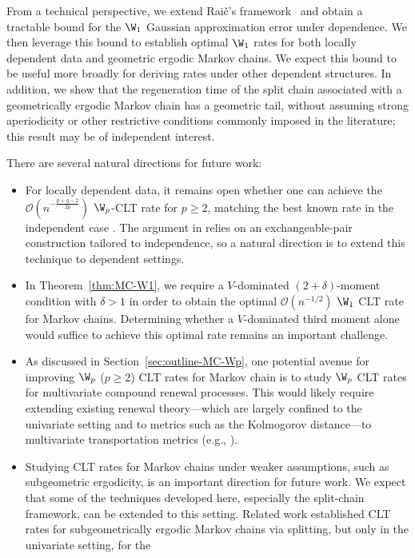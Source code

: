 \documentclass[mnsc,nonblindrev]{informs3}
\begin{document}
From a technical perspective, we extend Rai\v{c}'s framework~\citep{raivc2018multivariate} and obtain a tractable bound for the
$\W_1$ Gaussian approximation error under dependence. We then leverage this bound to establish optimal $\W_1$ rates for both locally dependent data
and geometric ergodic Markov chains. We expect this bound to be useful more broadly for
deriving rates under other dependent structures. In addition, we show that the
regeneration time of the split chain associated with a geometrically ergodic
Markov chain has a geometric tail, without assuming strong aperiodicity or other
restrictive conditions commonly imposed in the literature; this result may be of
independent interest.

There are several natural directions for future work:
\begin{itemize}
    \item For locally dependent data, it remains open whether one can achieve the
\(\mathcal O(n^{-\frac{p+q-2}{2p}})\) \(\W_p\)-CLT rate for \(p\ge 2\),
matching the best known rate in the independent case \citep{bonis2020stein}.
The argument in \cite{bonis2020stein} relies on an exchangeable-pair
construction tailored to independence, so a natural direction is to extend
this technique to dependent settings.
\item In Theorem~\ref{thm:MC-W1}, we require a $V$-dominated $(2+\delta)$-moment
condition with $\delta>1$ in order to obtain the optimal
$\mathcal O(n^{-1/2})$ $\W_1$ CLT rate for Markov chains. 
Determining whether a $V$-dominated third
moment alone would suffice to achieve this optimal rate remains an important challenge.
\item As discussed in Section~\ref{sec:outline-MC-Wp}, one potential avenue for improving $\W_p$ ($p\ge 2$) CLT rates for Markov chain is to study $\W_p$ CLT rates for
multivariate compound renewal processes. This would likely require extending existing renewal
theory---which are largely confined to the univariate setting and to
metrics such as the Kolmogorov distance---to multivariate transportation metrics
(e.g., \cite{cox1962renewal,cox2017theory,malinovskii2021level}).
\item Studying CLT rates for Markov chains under weaker assumptions, such as
subgeometric ergodicity, is an important direction for future work. We expect
that some of the techniques developed here, especially the split-chain
framework, can be extended to this setting. Related work
\citep{douc2008bounds} established CLT rates for subgeometrically ergodic
Markov chains via splitting, but only in the univariate setting, for the

\end{itemize}
\end{document}
